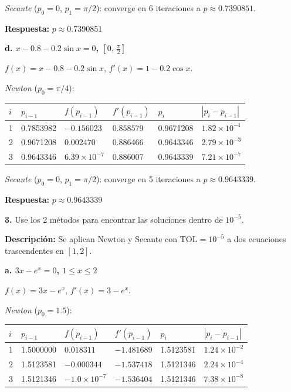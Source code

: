 \documentclass[12pt,a4paper]{article}
\begin{document}
\textit{Secante} ($p_0=0$, $p_1=\pi/2$): converge en 6 iteraciones a $p \approx 0.7390851$.

\textbf{Respuesta:} $p \approx \boxed{0.7390851}$

\vspace{0.3cm}
\textbf{d. $x - 0.8 - 0.2\sin x = 0$, $\left[0,\,\tfrac{\pi}{2}\right]$}

$f(x) = x - 0.8 - 0.2\sin x$, \quad $f'(x) = 1 - 0.2\cos x$.

\textit{Newton} ($p_0 = \pi/4$):

\begin{center}\small
\begin{tabular}{C{0.5cm}C{2.5cm}C{2.5cm}C{2.5cm}C{2.5cm}C{1.8cm}}
\toprule
$i$ & $p_{i-1}$ & $f(p_{i-1})$ & $f'(p_{i-1})$ & $p_i$ & $|p_i - p_{i-1}|$ \\
 & 0.7853982 & $-0.156023$ & $0.858579$ & 0.9671208 & $1.82\times10^{-1}$ \\
2 & 0.9671208 & $0.002470$ & $0.886466$ & 0.9643346 & $2.79\times10^{-3}$ \\
3 & 0.9643346 & $6.39\times10^{-7}$ & $0.886007$ & 0.9643339 & $7.21\times10^{-7}$ \\
\bottomrule
\end{tabular}
\end{center}

\textit{Secante} ($p_0=0$, $p_1=\pi/2$): converge en 5 iteraciones a $p \approx 0.9643339$.

\textbf{Respuesta:} $p \approx \boxed{0.9643339}$

\vspace{0.4cm}

\textbf{3.} Use los 2 m\'etodos para encontrar las soluciones dentro de $10^{-5}$.

\textbf{Descripci\'on:} Se aplican Newton y Secante con $\text{TOL} = 10^{-5}$ a dos ecuaciones trascendentes en $[1, 2]$.

\textbf{a. $3x - e^x = 0$, \; $1 \leq x \leq 2$}

$f(x) = 3x - e^x$, \quad $f'(x) = 3 - e^x$.

\textit{Newton} ($p_0 = 1.5$):

\begin{center}\small
\begin{tabular}{C{0.5cm}C{2.5cm}C{2.5cm}C{2.5cm}C{2.5cm}C{1.8cm}}
\toprule
$i$ & $p_{i-1}$ & $f(p_{i-1})$ & $f'(p_{i-1})$ & $p_i$ & $|p_i-p_{i-1}|$ \\
 & 1.5000000 & $0.018311$ & $-1.481689$ & 1.5123581 & $1.24\times10^{-2}$ \\
2 & 1.5123581 & $-0.000344$ & $-1.537418$ & 1.5121346 & $2.24\times10^{-4}$ \\
3 & 1.5121346 & $-1.0\times10^{-7}$ & $-1.536404$ & 1.5121346 & $7.38\times10^{-8}$ \\
\bottomrule
\end{tabular}
\end{center}
\end{document}
